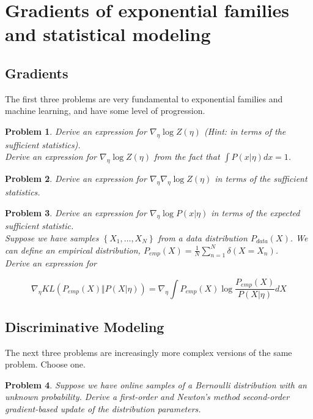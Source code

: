 \documentclass[a4paper]{article}
\newtheorem{problem}{Problem}[section]
\begin{document}
\section{Gradients of exponential families and statistical modeling}

\subsection{Gradients}

The first three problems are very fundamental to exponential families and machine learning, and have some level of progression.

\begin{problem}
Derive an expression for $ \nabla_\eta \log Z(\eta) $ (Hint: in terms of the sufficient statistics). \\
Derive an expression for $ \nabla_\eta \log Z(\eta) $ from the fact that $ \int P( x \vert \eta) dx = 1 $.
\end{problem}

\begin{problem}
Derive an expression for $ \nabla_\eta \nabla_\eta \log Z(\eta) $ in terms of the sufficient statistics.
\end{problem}

\begin{problem}
Derive an expression for $ \nabla_\eta \log P( x \vert \eta ) $ in terms of the expected sufficient statistic. \\
Suppose we have samples $\left\{ X_1, \ldots, X_N \right\}$ from a data distribution $P_{data}(X)$. We can define an empirical distribution, $ P_{emp}(X) = \frac{1}{N} \sum_{n=1}^N \delta(X = X_n) $.  \\
Derive an expression for

\begin{equation}
  \nabla_\eta KL\left( P_{emp}(X) \Vert P( X \vert \eta) \right) = \nabla_\eta \int P_{emp}(X) \log \frac{P_{emp}(X)}{P( X \vert \eta) } dX
  \label{}
\end{equation}
\end{problem}

\subsection{Discriminative Modeling}
The next three problems are increasingly more complex versions of the same problem.  Choose one.

\begin{problem}
  Suppose we have online samples of a Bernoulli distribution with an unknown probability.  Derive a first-order and Newton's method second-order gradient-based update of the distribution parameters.
\end{problem}
\end{document}
